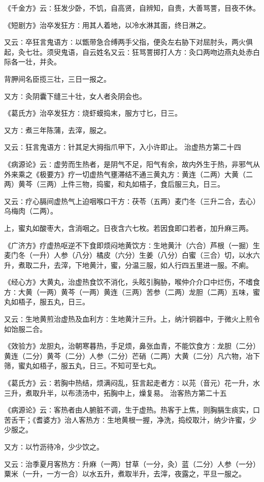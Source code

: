 \documentclass[a4paper,12pt,UTF8,twoside]{ctexbook}
\begin{document}
《千金方》云∶狂发少卧，不饥，自高贤，自辨知，自贵，大善骂詈，目夜不休。

《短剧方》治卒发狂方∶用其人着地，以冷水淋其面，终日淋之。

又云∶卒狂言鬼语方∶以甑带急合缚两手父指，便灸左右胁下对屈肘头，两火俱起，灸七壮。须臾鬼语，自云姓名又云∶狂骂詈掷打人方∶灸口两吻边燕丸处赤白际各一壮，并灸。

背胛间名臣揽三壮，三日一报之。

又方∶灸阴囊下缝三十壮，女人者灸阴会也。

《葛氏方》治卒发狂方∶烧虾蟆捣末，服方寸匕，日三。

又方∶煮三年陈蒲，去滓，服之。

又云∶狂言鬼语方∶针其足大拇指爪甲下，入小许即止。
治虚热方第二十四

《病源论》云∶虚劳而生热者，是阴气不足，阳气有余，故内外生于热，非邪气从外来乘之《极要方》疗一切虚热气壅滞结不通三黄丸方∶黄连（二两）大黄（二两）黄芩（三两）上件三物，捣蜜，和丸如梧子，食后服三丸，日三。

又云∶疗心膈间虚热气上迫咽喉口干方∶茯苓（五两）麦门冬（三升二合，去心）乌梅肉（二两）。

上，蜜丸如酸枣大，含消咽之。日夜含六七枚。若因食即口若者，加升麻三两。

《广济方》疗虚热呕逆不下食即烦闷地黄饮方∶生地黄汁（六合）芦根（一掘）生麦门冬（一升）人参（八分）橘皮（六分）生姜（八分）白蜜（三合）切，以水六升，煮取二升，去滓，下地黄汁，蜜，分温三服，如人行四五里进一服。不痢。

《经心方》大黄丸，治虚热食饮不消化，头眩引胸胁，喉仲介介口中烂伤，不嗜食方∶大黄（一两）黄芩（一两）黄连（三两）苦参（二两）龙胆（二两）五味，蜜丸如梧子，服五丸，日三。

又云∶生地黄煎治虚热及血利方∶生地黄汁三升。上，纳汁铜器中，于微火上煎令如饴服二合。

《效验方》龙胆丸，治朝寒暮热，手足烦，鼻张血青，不能饮食方∶龙胆（二分）黄连（二分）黄芩（二分）人参（二分）芒硝（二两）大黄（二分）凡六物，冶下筛，蜜丸如梧子，服五丸，日三。不知可至七丸。

《葛氏方》云∶若胸中热结，烦满闷乱，狂言起走者方∶以芫（音元）花一升，水三升，煮取升半，以布渍汤中，拓胸中上，燥复易。
治客热方第二十五

《病源论》云∶客热者由人腑脏不调，生于虚热。热客于上焦，则胸膈生痰实，口苦舌干；《耆婆方》治人客热方∶生地黄根一握，净洗，捣绞取汁，纳少许蜜，少少服之。

又方∶以竹沥待冷，少少饮之。

又云∶治季夏月客热方∶升麻（一两）甘草（一分，灸）蓝（二分）人参（一分）粟米（一升，一方一合）以水五升，煮取半升，去滓，夜露之，平旦一服之。
\end{document}
